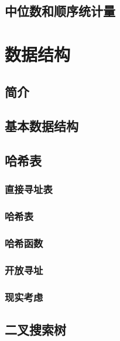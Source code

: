 \documentclass[lang=cn,newtx,10pt,scheme=chinese]{elegantbook}
\begin{document}
\chapter{中位数和顺序统计量}\label{chapter-09}

\part{数据结构}

\chapter*{简介}

\chapter{基本数据结构}\label{chapter-10}

\chapter{哈希表}\label{chapter-11}

\section{直接寻址表}\label{section-11.1}

\section{哈希表}\label{section-11.2}

\section{哈希函数}\label{section-11.3}

\section{开放寻址}\label{section-11.4}

\section{现实考虑}\label{section-11.5}

\chapter{二叉搜索树}\label{chapter-12}
\end{document}

